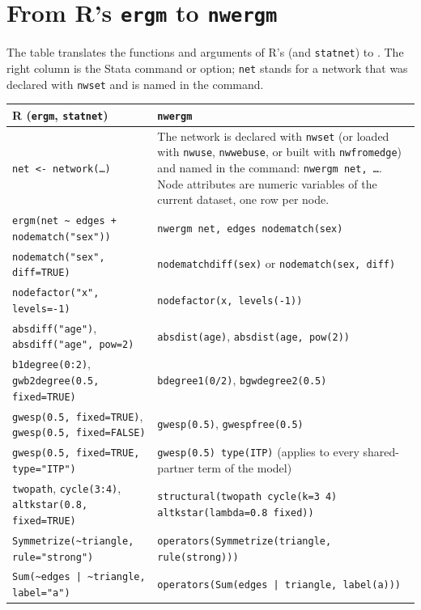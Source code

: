 \chapter{From R's \texttt{ergm} to \texttt{nwergm}}\label{app:translation}

The table translates the functions and arguments of R's \ergm{} (and \texttt{statnet}) to \nwergm{}. The right column is the Stata command or option; \texttt{net} stands for a network that was declared with \texttt{nwset} and is named in the command.

\footnotesize
\begin{longtable}{@{}>{\raggedright\arraybackslash}p{6.4cm}>{\raggedright\arraybackslash}p{9.3cm}@{}}
\toprule
R (\texttt{ergm}, \texttt{statnet}) & \texttt{nwergm}\\
\midrule\endhead
\texttt{net <- network(\ldots)} & The network is declared with \texttt{nwset} (or loaded with \texttt{nwuse}, \texttt{nwwebuse}, or built with \texttt{nwfromedge}) and named in the command: \texttt{nwergm net, \ldots}. Node attributes are numeric variables of the current dataset, one row per node.\\
\texttt{ergm(net \textasciitilde{} edges + nodematch("sex"))} & \texttt{nwergm net, edges nodematch(sex)}\\
\texttt{nodematch("sex", diff=TRUE)} & \texttt{nodematchdiff(sex)} or \texttt{nodematch(sex, diff)}\\
\texttt{nodefactor("x", levels=-1)} & \texttt{nodefactor(x, levels(-1))}\\
\texttt{absdiff("age")}, \texttt{absdiff("age", pow=2)} & \texttt{absdist(age)}, \texttt{absdist(age, pow(2))}\\
\texttt{b1degree(0:2)}, \texttt{gwb2degree(0.5, fixed=TRUE)} & \texttt{bdegree1(0/2)}, \texttt{bgwdegree2(0.5)}\\
\texttt{gwesp(0.5, fixed=TRUE)}, \texttt{gwesp(0.5, fixed=FALSE)} & \texttt{gwesp(0.5)}, \texttt{gwespfree(0.5)}\\
\texttt{gwesp(0.5, fixed=TRUE, type="ITP")} & \texttt{gwesp(0.5) type(ITP)} (applies to every shared-partner term of the model)\\
\texttt{twopath}, \texttt{cycle(3:4)}, \texttt{altkstar(0.8, fixed=TRUE)} & \texttt{structural(twopath cycle(k=3 4) altkstar(lambda=0.8 fixed))}\\
\texttt{Symmetrize(\textasciitilde triangle, rule="strong")} & \texttt{operators(Symmetrize(triangle, rule(strong)))}\\
\texttt{Sum(\textasciitilde edges | \textasciitilde triangle, label="a")} & \texttt{operators(Sum(edges | triangle, label(a)))}\\

\end{longtable}
